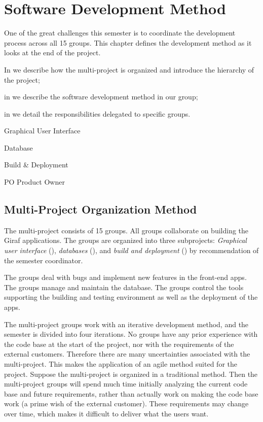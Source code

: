 \chapter{Software Development Method}\label{chap:sw_dev_method}
One of the great challenges this semester is to coordinate the development process across all 15 groups. This chapter defines the development method as it looks at the end of the project.

\begin{chapterorganization}
  \item In  we describe how the multi-project is organized and introduce the hierarchy of the project;
  \item in  we describe the software development method in our group;
  \item in  we detail the responsibilities delegated to specific groups.
\end{chapterorganization}

\begin{abbreviations}
  \item[\gui] Graphical User Interface
  \item[\db] Database
  \item[\bd] Build \& Deployment
  \item[PO] Product Owner
\end{abbreviations}

\section{Multi-Project Organization Method}\label{sec:project_overview}
The multi-project consists of 15 groups. All groups collaborate on building the Giraf applications. The groups are organized into three subprojects: \emph{Graphical user interface} (\gui), \emph{databases} (\db), and \emph{build and deployment} (\bd) by recommendation of the semester coordinator.

The \gui groups deal with bugs and implement new features in the front-end apps. The \db groups manage and maintain the database. The \bd groups control the tools supporting the building and testing environment as well as the deployment of the apps.

The multi-project groups work with an iterative development method, and the semester is divided into four iterations. No groups have any prior experience with the code base at the start of the project, nor with the requirements of the external customers. Therefore there are many uncertainties associated with the multi-project. This makes the application of an agile method suited for the project. Suppose the multi-project is organized in a traditional method. Then the multi-project groups will spend much time initially analyzing the current code base and future requirements, rather than actually work on making the code base work (a prime wish of the external customer). These requirements may change over time, which makes it difficult to deliver what the users want.

